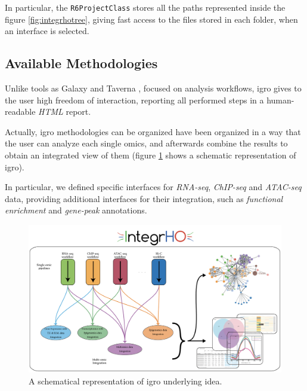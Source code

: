 In particular, the \lstinline!R6ProjectClass! stores all the paths represented inside the figure \ref{fig:integrhotree}, giving fast access to the files stored in each folder, when an interface is selected.


\subsection{Available Methodologies}

Unlike tools as Galaxy \cite{Hillman-Jackson2012} and Taverna \cite{Wolstencroft2013}, focused on analysis workflows, \gls{igro} gives to the user high freedom of interaction, reporting all performed steps in a human-readable \textit{HTML} report.
 
Actually, \gls{igro} methodologies can be organized have been organized in a way that the user can analyze each single omics, and afterwards combine the results to obtain an integrated view of them (figure \ref{fig:integrhoidea} shows a schematic representation of \gls{igro}).

In particular, we defined specific interfaces for \textit{RNA-seq}, \textit{ChIP-seq} and \textit{ATAC-seq} data, providing additional interfaces for their integration, such as \textit{functional enrichment} and \textit{gene-peak} annotations.

\begin{figure}[H]
\centering
\includegraphics[width=\textwidth, keepaspectratio]{img/integrho/integrho_scheme.pdf}
\caption[\gls{igro} representation]{A schematical representation of \gls{igro} underlying idea.}
\label{fig:integrhoidea}
\end{figure}

